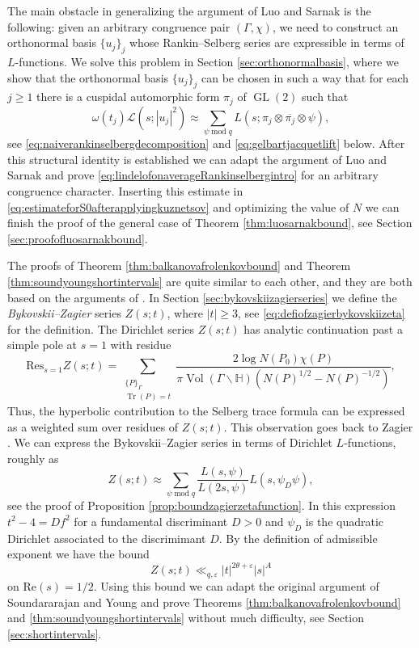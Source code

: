 \documentclass{article}
\theoremstyle{named}
\renewcommand{\L}{\mathcal{L}}
\newcommand{\Hyp}{\mathbb{H}}
\DeclareMathOperator{\GL}{GL}
\DeclareMathOperator{\vol}{Vol}
\DeclareMathOperator{\Tr}{Tr}
\DeclareMathOperator{\modulo}{mod}
\begin{document}
The main obstacle in generalizing the argument of Luo and Sarnak is the following: given an arbitrary congruence pair $(\Gamma, \chi)$, we need to construct an orthonormal basis $\{u_j\}_j$ whose Rankin--Selberg series are expressible in terms of $L$-functions. We solve this problem in Section \ref{sec:orthonormalbasis}, where we show that the orthonormal basis $\{u_j\}_j$ can be chosen in such a way that for each $j\geq 1$ there is a cuspidal automorphic form $\pi_j$ of $\GL(2)$ such that 
\begin{equation}\label{eq:keyapproxidentityrankinselberg}
    \omega(t_j)\L(s; |u_j|^2) \approx \sum_{\psi \modulo q} L(s; \pi_j \otimes \overline{\pi_j} \otimes \psi),
\end{equation} 
see \eqref{eq:naiverankinselbergdecomposition} and \eqref{eq:gelbartjacquetlift} below. After this structural identity is established we can adapt the argument of Luo and Sarnak and prove \eqref{eq:lindelofonaverageRankinselbergintro} for an arbitrary congruence character. Inserting this estimate in \eqref{eq:estimateforS0afterapplyingkuznetsov} and optimizing the value of $N$ we can finish the proof of the general case of Theorem \ref{thm:luosarnakbound}, see Section \ref{sec:proofofluosarnakbound}.

The proofs of Theorem \ref{thm:balkanovafrolenkovbound} and Theorem \ref{thm:soundyoungshortintervals} are quite similar to each other, and they are both based on the arguments of \cite{Soundararajan_2013}. In Section \ref{sec:bykovskiizagierseries} we define the \emph{Bykovskii--Zagier} series $Z(s; t)$, where $|t| \geq 3$, see \eqref{eq:defiofzagierbykovskiizeta} for the definition. The Dirichlet series $Z(s; t)$ has analytic continuation past a simple pole at $s = 1$ with residue
\begin{equation*}
    \text{Res}_{s = 1}Z(s; t) = \sum_{\substack{\{P\}_\Gamma\\
    \Tr(P) = t}} \frac{2 \log N(P_0) \chi(P)}{\pi \vol(\Gamma\backslash \Hyp)(N(P)^{1/2} - N(P)^{-1/2})} ,
\end{equation*} 
Thus, the hyperbolic contribution to the Selberg trace formula can be expressed as a weighted sum over residues of $Z(s; t)$. This observation goes back to Zagier \cite{zagierrankinselberg}. We can express the Bykovskii--Zagier series in terms of Dirichlet $L$-functions, roughly as
\begin{equation*}
    Z(s; t) \approx \sum_{\psi \modulo q} \frac{L(s, \psi)}{L(2s, \psi)}L(s, \psi_D \psi),
\end{equation*}
see the proof of Proposition \ref{prop:boundzagierzetafunction}. In this expression $t^2- 4 = Df^2$ for a fundamental discriminant $D >0$ and $\psi_D$ is the quadratic Dirichlet associated to the discrimimant $D$. By the definition of admissible exponent we have the bound 
\begin{equation}\label{eq:boundonzagierintro}
    Z(s; t) \ll_{q, \varepsilon} |t|^{2\theta + \varepsilon} |s|^A
\end{equation}
on $\text{Re}(s) = 1/2$. Using this bound we can adapt the original argument of Soundararajan and Young and prove Theorems \ref{thm:balkanovafrolenkovbound} and \ref{thm:soundyoungshortintervals} without much difficulty, see Section \ref{sec:shortintervals}.
\end{document}
